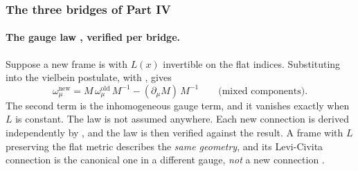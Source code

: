 \subsubsection{The three bridges of Part IV}
\label{csc:bridges}\label{sec:3.8.9}

\paragraph{The gauge law , verified per bridge.} Suppose a new frame is
 with $L(x)$ invertible on the flat indices. Substituting into the
vielbein postulate, with , gives
\begin{equation}
  \omega^{\text{new}}_\mu=M\,\omega^{\text{old}}_\mu\,M^{-1}-(\partial_\mu M)\,M^{-1}\qquad\text{(mixed components)}.
\end{equation}
The second term is the inhomogeneous gauge term, and it vanishes exactly when $L$ is constant.
The law is not assumed anywhere. Each new connection is derived independently by
, and the law is then verified against the result. A frame
 with $L$ preserving the flat metric describes the \emph{same geometry},
and its Levi-Civita connection is the canonical one in a different gauge, \emph{not} a new
connection .

\label{sec:3.8.9.1}

